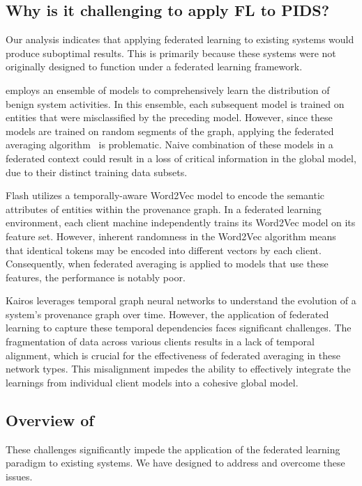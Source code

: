 \subsection{Why is it challenging to apply FL to PIDS?}


Our analysis indicates that applying federated learning to existing systems would produce suboptimal results. This is primarily because these systems were not originally designed to function under a federated learning framework.

\threatrace employs an ensemble of \gnnshort models to comprehensively learn the distribution of benign system activities. In this ensemble, each subsequent model is trained on entities that were misclassified by the preceding model. However, since these models are trained on random segments of the graph, applying the federated averaging algorithm~\cite{mcmahan2017communication} is problematic. Naive combination of these models in a federated context could result in a loss of critical information in the global model, due to their distinct training data subsets.

Flash utilizes a temporally-aware Word2Vec model to encode the semantic attributes of entities within the provenance graph. In a federated learning environment, each client machine independently trains its Word2Vec model on its feature set. However, inherent randomness in the Word2Vec algorithm means that identical tokens may be encoded into different vectors by each client. Consequently, when federated averaging is applied to \gnn models that use these features, the performance is notably poor.

Kairos leverages temporal graph neural networks to understand the evolution of a system's provenance graph over time. However, the application of federated learning to capture these temporal dependencies faces significant challenges. The fragmentation of data across various clients results in a lack of temporal alignment, which is crucial for the effectiveness of federated averaging in these network types. This misalignment impedes the ability to effectively integrate the learnings from individual client models into a cohesive global model.


\subsection{Overview of \Sys}
These challenges significantly impede the application of the federated learning paradigm to existing systems. We have designed \Sys to address and overcome these issues. 
